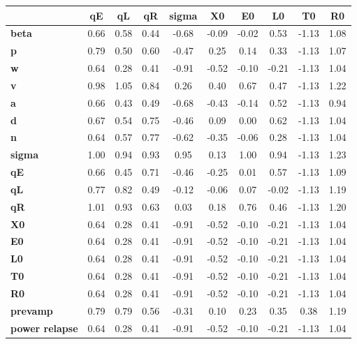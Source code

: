 \begin{tiny}\begin{tabular}{|l|c|c|c|c|c|c|c|c|c|}
\hline
&\textbf{qE}&\textbf{qL}&\textbf{qR}&\textbf{sigma}&\textbf{X0}&\textbf{E0}&\textbf{L0}&\textbf{T0}&\textbf{R0}\\\hline
\textbf{beta}&0.66&0.58&0.44&-0.68&-0.09&-0.02&0.53&-1.13&1.08\\\hline
\textbf{p}&0.79&0.50&0.60&-0.47&0.25&0.14&0.33&-1.13&1.07\\\hline
\textbf{w}&0.64&0.28&0.41&-0.91&-0.52&-0.10&-0.21&-1.13&1.04\\\hline
\textbf{v}&0.98&1.05&0.84&0.26&0.40&0.67&0.47&-1.13&1.22\\\hline
\textbf{a}&0.66&0.43&0.49&-0.68&-0.43&-0.14&0.52&-1.13&0.94\\\hline
\textbf{d}&0.67&0.54&0.75&-0.46&0.09&0.00&0.62&-1.13&1.04\\\hline
\textbf{n}&0.64&0.57&0.77&-0.62&-0.35&-0.06&0.28&-1.13&1.04\\\hline
\textbf{sigma}&1.00&0.94&0.93&0.95&0.13&1.00&0.94&-1.13&1.23\\\hline
\textbf{qE}&0.66&0.45&0.71&-0.46&-0.25&0.01&0.57&-1.13&1.09\\\hline
\textbf{qL}&0.77&0.82&0.49&-0.12&-0.06&0.07&-0.02&-1.13&1.19\\\hline
\textbf{qR}&1.01&0.93&0.63&0.03&0.18&0.76&0.46&-1.13&1.20\\\hline
\textbf{X0}&0.64&0.28&0.41&-0.91&-0.52&-0.10&-0.21&-1.13&1.04\\\hline
\textbf{E0}&0.64&0.28&0.41&-0.91&-0.52&-0.10&-0.21&-1.13&1.04\\\hline
\textbf{L0}&0.64&0.28&0.41&-0.91&-0.52&-0.10&-0.21&-1.13&1.04\\\hline
\textbf{T0}&0.64&0.28&0.41&-0.91&-0.52&-0.10&-0.21&-1.13&1.04\\\hline
\textbf{R0}&0.64&0.28&0.41&-0.91&-0.52&-0.10&-0.21&-1.13&1.04\\\hline
\textbf{prevamp}&0.79&0.79&0.56&-0.31&0.10&0.23&0.35&0.38&1.19\\\hline
\textbf{power relapse}&0.64&0.28&0.41&-0.91&-0.52&-0.10&-0.21&-1.13&1.04\\\hline
\end{tabular}
\end{tiny}